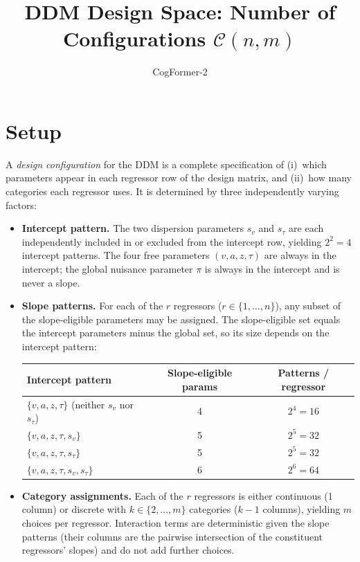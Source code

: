 \documentclass[11pt]{article}
\title{DDM Design Space: Number of Configurations $\mathcal{C}(n, m)$}
\author{CogFormer-2}
\date{}
\begin{document}
\maketitle

\section*{Setup}

A \emph{design configuration} for the DDM is a complete specification of
(i)~which parameters appear in each regressor row of the design matrix, and
(ii)~how many categories each regressor uses.
It is determined by three independently varying factors:

\begin{itemize}
  \item \textbf{Intercept pattern.}  The two dispersion parameters $s_v$ and
    $s_\tau$ are each independently included in or excluded from the
    intercept row, yielding $2^2 = 4$ intercept patterns.  The four
    free parameters $(v, a, z, \tau)$ are always in the intercept; the global
    nuisance parameter $\pi$ is always in the intercept and is never a slope.

  \item \textbf{Slope patterns.}  For each of the $r$ regressors
    ($r \in \{1, \dots, n\}$), any subset of the slope-eligible parameters
    may be assigned.  The slope-eligible set equals the intercept parameters
    minus the global set, so its size depends on the intercept pattern:

    \medskip
    \begin{center}
    \begin{tabular}{lcc}
      \toprule
      Intercept pattern & Slope-eligible params & Patterns / regressor \\
      \midrule
      $\{v, a, z, \tau\}$ (neither $s_v$ nor $s_\tau$)    & 4 & $2^4 = 16$ \\
      $\{v, a, z, \tau, s_v\}$                             & 5 & $2^5 = 32$ \\
      $\{v, a, z, \tau, s_\tau\}$                          & 5 & $2^5 = 32$ \\
      $\{v, a, z, \tau, s_v, s_\tau\}$                     & 6 & $2^6 = 64$ \\
      \bottomrule
    \end{tabular}
    \end{center}

  \item \textbf{Category assignments.}  Each of the $r$ regressors is
    either continuous (1 column) or discrete with $k \in \{2, \dots, m\}$
    categories ($k{-}1$ columns), yielding $m$ choices per regressor.
    Interaction terms are deterministic given the slope patterns (their
    columns are the pairwise intersection of the constituent regressors'
    slopes) and do not add further choices.
\end{itemize}
\end{document}
